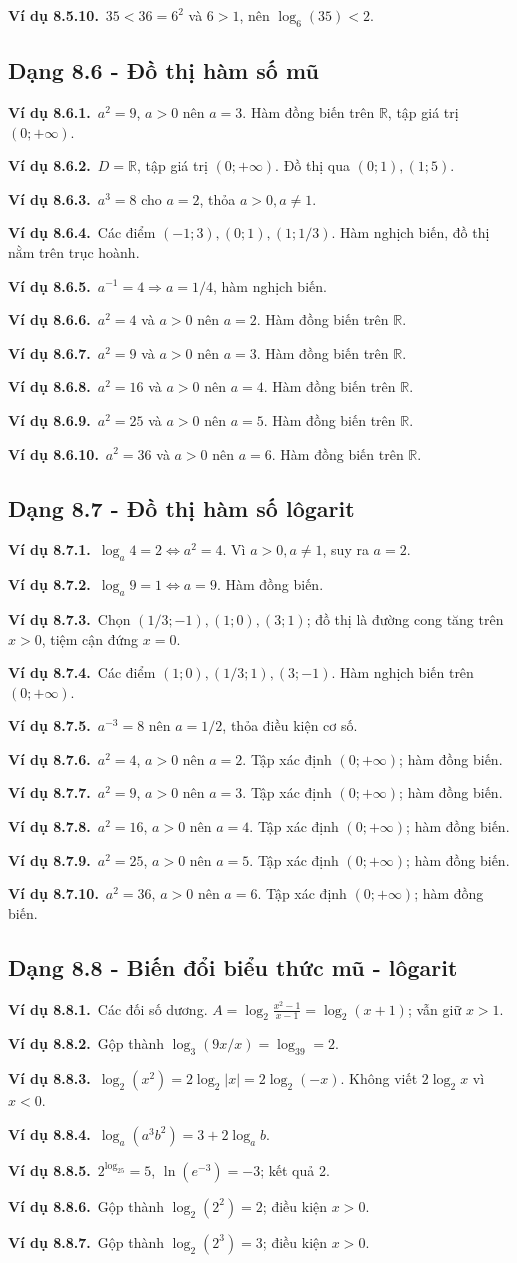 \documentclass[11pt,a4paper]{article}
\newcommand{\vd}[1]{\par\Needspace{3\baselineskip}\textbf{\color{teal}Ví dụ #1.}\ }
\begin{document}
\vd{8.5.10}$35<36=6^2$ và $6>1$, nên $\log_{6}(35)<2$.
\subsection{Dạng 8.6 - Đồ thị hàm số mũ}
\vd{8.6.1}$a^2=9$, $a>0$ nên $a=3$. Hàm đồng biến trên $\mathbb R$, tập giá trị $(0;+\infty)$.
\vd{8.6.2}$D=\mathbb R$, tập giá trị $(0;+\infty)$. Đồ thị qua $(0;1),(1;5)$.
\vd{8.6.3}$a^3=8$ cho $a=2$, thỏa $a>0,a\ne1$.
\vd{8.6.4}Các điểm $(-1;3),(0;1),(1;1/3)$. Hàm nghịch biến, đồ thị nằm trên trục hoành.
\vd{8.6.5}$a^{-1}=4\Rightarrow a=1/4$, hàm nghịch biến.
\vd{8.6.6}$a^2=4$ và $a>0$ nên $a=2$. Hàm đồng biến trên $\mathbb R$.
\vd{8.6.7}$a^2=9$ và $a>0$ nên $a=3$. Hàm đồng biến trên $\mathbb R$.
\vd{8.6.8}$a^2=16$ và $a>0$ nên $a=4$. Hàm đồng biến trên $\mathbb R$.
\vd{8.6.9}$a^2=25$ và $a>0$ nên $a=5$. Hàm đồng biến trên $\mathbb R$.
\vd{8.6.10}$a^2=36$ và $a>0$ nên $a=6$. Hàm đồng biến trên $\mathbb R$.
\subsection{Dạng 8.7 - Đồ thị hàm số lôgarit}
\vd{8.7.1}$\log_a4=2\Leftrightarrow a^2=4$. Vì $a>0,a\ne1$, suy ra $a=2$.
\vd{8.7.2}$\log_a9=1\Leftrightarrow a=9$. Hàm đồng biến.
\vd{8.7.3}Chọn $(1/3;-1),(1;0),(3;1)$; đồ thị là đường cong tăng trên $x>0$, tiệm cận đứng $x=0$.
\vd{8.7.4}Các điểm $(1;0),(1/3;1),(3;-1)$. Hàm nghịch biến trên $(0;+\infty)$.
\vd{8.7.5}$a^{-3}=8$ nên $a=1/2$, thỏa điều kiện cơ số.
\vd{8.7.6}$a^2=4$, $a>0$ nên $a=2$. Tập xác định $(0;+\infty)$; hàm đồng biến.
\vd{8.7.7}$a^2=9$, $a>0$ nên $a=3$. Tập xác định $(0;+\infty)$; hàm đồng biến.
\vd{8.7.8}$a^2=16$, $a>0$ nên $a=4$. Tập xác định $(0;+\infty)$; hàm đồng biến.
\vd{8.7.9}$a^2=25$, $a>0$ nên $a=5$. Tập xác định $(0;+\infty)$; hàm đồng biến.
\vd{8.7.10}$a^2=36$, $a>0$ nên $a=6$. Tập xác định $(0;+\infty)$; hàm đồng biến.
\subsection{Dạng 8.8 - Biến đổi biểu thức mũ - lôgarit}
\vd{8.8.1}Các đối số dương. $A=\log_2\frac{x^2-1}{x-1}=\log_2(x+1)$; vẫn giữ $x>1$.
\vd{8.8.2}Gộp thành $\log_3(9x/x)=\log_39=2$.
\vd{8.8.3}$\log_2(x^2)=2\log_2|x|=2\log_2(-x)$. Không viết $2\log_2x$ vì $x<0$.
\vd{8.8.4}$\log_a(a^3b^2)=3+2\log_ab$.
\vd{8.8.5}$2^{\log_25}=5$, $\ln(e^{-3})=-3$; kết quả 2.
\vd{8.8.6}Gộp thành $\log_2(2^{2})=2$; điều kiện $x>0$.
\vd{8.8.7}Gộp thành $\log_2(2^{3})=3$; điều kiện $x>0$.
\end{document}
